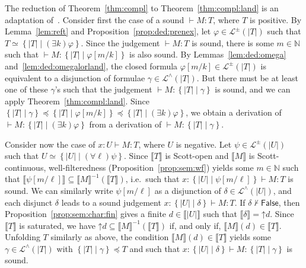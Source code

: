 \documentclass[%
  a4paper,
  UKenglish,
  cleveref,
  autoref,
  thm-restate,
  numberwithinsect,
]{lipics-v2021}
\newcommand\sle\subseteq
\newcommand\thesis{\vdash}
\newcommand\up{\mathord{\uparrow}}
\newcommand\NN{\mathbb{N}}
\newcommand\I[1]{\llbracket #1 \rrbracket} %
\newcommand\temp[1]{\mathsf{#1}}
\newcommand\False{\temp{False}}
\newcommand\subtype\preceq
\newcommand\eqtype\simeq
\newcommand\reft[1]{\left\{ #1 \right\}}
\newcommand\RT{T}               %
\newcommand\RTbis{U}            %
\newcommand\UPT[1]{\vert #1 \vert}        %
\newcommand\itvar{k}
\newcommand\itvarbis{\ell}
\newcommand\Lang{\mathcal{L}}
\begin{document}
The reduction of Theorem~\ref{thm:compl} to Theorem~\ref{thm:compl:land}
is an adaptation of~\cite{bk03ic,rk25wollic}.
%
Consider first the case of a sound $\thesis M \colon \RT$,
where $\RT$ is positive.
By Lemma~\ref{lem:reft} and Proposition~\ref{prop:ded:prenex},
let $\varphi \in \Lang^\pm(\UPT\RT)$
such that $\RT \eqtype \reft{\UPT\RT \mid (\exists \itvar)\varphi}$.
Since the judgement $\thesis M \colon \RT$
is sound, there is some $m \in \NN$
such that $\thesis M \colon \reft{\UPT\RT \mid \varphi[m/\itvar]}$
is also sound.
By Lemmas~\ref{lem:ded:omega} and~\ref{lem:ded:omegalorland},
the closed formula $\varphi[m/\itvar] \in \Lang^\pm(\UPT\RT)$
is equivalent to a disjunction of formulae $\gamma \in \Lang^\land(\UPT\RT)$.
But there must be at least one of these $\gamma$'s such that
the judgement $\thesis M \colon \reft{\UPT\RT \mid \gamma}$ is sound,
and we can apply Theorem~\ref{thm:compl:land}.
%
%
Since
\(
  \reft{\UPT\RT \mid \gamma}
  \subtype
  \reft{\UPT\RT \mid \varphi[m / \itvar]}
  \subtype
  \reft{\UPT\RT \mid (\exists \itvar)\varphi}
\),
we obtain a derivation of 
$\thesis M \colon \reft{\UPT\RT \mid (\exists \itvar)\varphi}$
from a derivation of $\thesis M \colon \reft{\UPT\RT \mid \gamma}$.

Consider now the case of $x \colon \RTbis \thesis M \colon \RT$,
where $\RTbis$ is negative.
Let $\psi \in \Lang^\pm(\UPT\RTbis)$
such that $\RTbis \eqtype \reft{\UPT\RTbis \mid (\forall \itvarbis)\psi}$.
Since $\I\RT$ is Scott-open and $\I M$ is Scott-continuous,
well-filteredness (Proposition~\ref{prop:sem:wf})
yields some $m \in \NN$ such that
$\I{\psi[m / \itvarbis]} \sle \I M^{-1}(\I\RT)$,
i.e.\ such that
$x \colon \reft{\UPT\RTbis \mid \psi[m / \itvarbis]} \thesis M \colon \RT$
is sound.
%
We can similarly write $\psi[m / \itvarbis]$ as a disjunction
of $\delta \in \Lang^\land(\UPT\RTbis)$,
and each disjunct $\delta$ leads to a sound judgement
$x \colon \reft{\UPT\RTbis \mid \delta} \thesis M \colon \RT$.
% 
If $\delta \not\thesis \False$, then Proposition~\ref{prop:sem:char:fin}
gives a finite $d \in \I{\UPT\RTbis}$ such that $\I\delta = \up d$.
Since $\I\RT$ is saturated, we have
$\up d \sle \I M^{-1}(\I\RT)$ if, and only if, $\I M(d) \in \I\RT$.
Unfolding $\RT$ similarly as above,
the condition $\I M(d) \in \I\RT$ yields some $\gamma \in \Lang^\land(\UPT\RT)$
with $\reft{\UPT\RT \mid \gamma} \subtype \RT$
and such that
$x \colon \reft{\UPT\RTbis \mid \delta} \thesis M \colon \reft{\UPT\RT \mid \gamma}$
is sound.%
%
%
\end{document}
